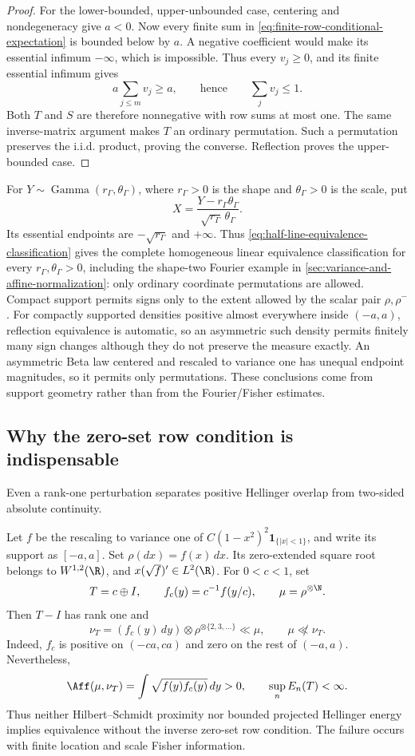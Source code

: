 \begin{proof}
For the lower-bounded, upper-unbounded case, centering and
nondegeneracy give \(a<0\).
Now every finite sum in \eqref{eq:finite-row-conditional-expectation}
is bounded below by \(a\).
A negative coefficient would make its essential infimum
\(-\infty\), which is impossible.
Thus every \(v_j\geq0\), and its finite essential infimum gives
\[
 a\sum_{j\leq m}v_j\geq a,
 \qquad\text{hence}\qquad \sum_jv_j\leq1.
\]
Both \(T\) and \(S\) are therefore nonnegative with row sums at
most one.
The same inverse-matrix argument makes \(T\) an ordinary
permutation.
Such a permutation preserves the i.i.d. product, proving the
converse.
Reflection proves the upper-bounded case.
\end{proof}

For \(Y\sim\operatorname{Gamma}(r_\Gamma,\theta_\Gamma)\), where
\(r_\Gamma>0\) is the shape and \(\theta_\Gamma>0\) is the scale, put
\[
 X=\frac{Y-r_\Gamma\theta_\Gamma}
         {\sqrt{r_\Gamma}\,\theta_\Gamma}.
\]
Its essential endpoints are \(-\sqrt{r_\Gamma}\) and \(+\infty\).
Thus \eqref{eq:half-line-equivalence-classification} gives the complete
homogeneous linear equivalence classification for every
\(r_\Gamma,\theta_\Gamma>0\), including the shape-two Fourier example in
\cref{sec:variance-and-affine-normalization}: only ordinary coordinate
permutations are allowed.
Compact support permits signs only to the extent allowed by the scalar pair
\(\rho,\rho^-\).
For compactly supported densities positive almost everywhere inside
\((-a,a)\), reflection equivalence is automatic, so an asymmetric such
density permits finitely many sign changes although they do not preserve the
measure exactly.
An asymmetric Beta law centered and rescaled to variance one has unequal
endpoint magnitudes, so it
permits only permutations.
These conclusions come from support geometry rather than from the
Fourier/Fisher estimates.

\subsection{Why the zero-set row condition is indispensable}
\label{sec:zero-set-row-condition-counterexample}

Even a rank-one perturbation separates positive Hellinger overlap from
two-sided absolute continuity.

Let \(f\) be the rescaling to variance one of
\(C(1-x^2)^2\mathbf 1_{\{|x|<1\}}\), and write its support as
\([-a,a]\).
Set \(\rho(dx)=f(x)\,dx\).
Its zero-extended square root belongs to \(W^{1,2}(\R)\), and
\(x(\sqrt f)'\in L^2(\R)\).
For \(0<c<1\), set
\[
 T=c\oplus I,\qquad
 f_c(y)=c^{-1}f(y/c),\qquad \mu=\rho^{\otimes\N}.
\]
Then \(T-I\) has rank one and
\[
 \nu_T=(f_c(y)\,dy)\otimes\rho^{\otimes\{2,3,\ldots\}}\ll\mu,
 \qquad \mu\not\ll\nu_T.
\]
Indeed, \(f_c\) is positive on \((-ca,ca)\) and zero on the rest
of \((-a,a)\).
Nevertheless,
\[
 \Aff(\mu,\nu_T)=\int\sqrt{f(y)f_c(y)}\,dy>0,
 \qquad \sup_n E_n(T)<\infty.
\]
Thus neither Hilbert--Schmidt proximity nor bounded projected Hellinger energy
implies equivalence without the inverse zero-set row condition.
The failure occurs with finite location and scale Fisher information.

